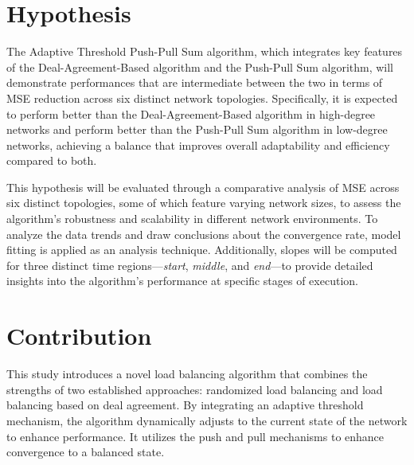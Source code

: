 \section{Hypothesis}\label{sec:hypothesis}
The Adaptive Threshold Push-Pull Sum algorithm, which integrates key features of the Deal-Agreement-Based algorithm and the Push-Pull Sum algorithm, will demonstrate performances that are intermediate between the two in terms of MSE reduction across six distinct network topologies. Specifically, it is expected to perform better than the Deal-Agreement-Based algorithm in high-degree networks and perform better than the Push-Pull Sum algorithm in low-degree networks, achieving a balance that improves overall adaptability and efficiency compared to both.

This hypothesis will be evaluated through a comparative analysis of MSE across six distinct topologies, some of which feature varying network sizes, to assess the algorithm's robustness and scalability in different network environments. To analyze the data trends and draw conclusions about the convergence rate, model fitting is applied as an analysis technique. Additionally, slopes will be computed for three distinct time regions—\textit{start}, \textit{middle}, and \textit{end}—to provide detailed insights into the algorithm's performance at specific stages of execution.

\section{Contribution}\label{sec:contribution}
This study introduces a novel load balancing algorithm that combines the strengths of two established approaches: randomized load balancing and load balancing based on deal agreement. By integrating an adaptive threshold mechanism, the algorithm dynamically adjusts to the current state of the network to enhance performance. It utilizes the push and pull mechanisms to enhance convergence to a balanced state.